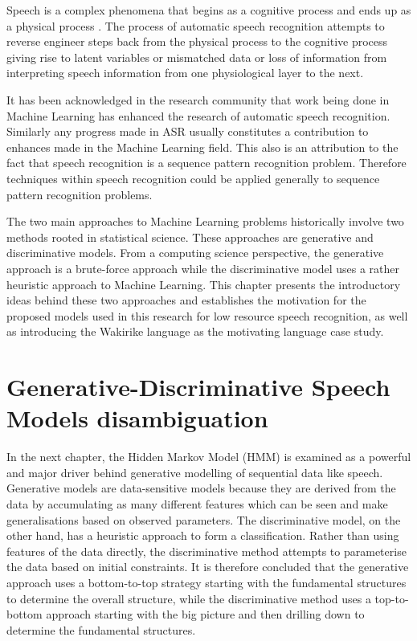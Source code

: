 Speech is a complex phenomena that begins as a cognitive process and ends up as a physical process \citep{becchetti1998}.  The process of automatic speech recognition attempts to reverse engineer steps back from the physical process to the cognitive process giving rise to latent variables or mismatched data or loss of information from interpreting speech information from one physiological layer to the next.

It has been acknowledged in the research community \citep{2015watanabe,deng2013machine}  that work being done in Machine Learning has enhanced the research of automatic speech recognition.  Similarly any progress made in ASR usually constitutes a contribution to enhances made in the Machine Learning field.  This also is an attribution to the fact that speech recognition is a sequence pattern recognition problem.  Therefore techniques within speech recognition could be applied generally to sequence pattern recognition problems.

The two main approaches to Machine Learning problems historically involve two methods rooted in statistical science.  These approaches are generative and discriminative models.  From a computing science perspective, the generative approach is a brute-force approach while the discriminative model uses a rather heuristic approach to Machine Learning. This chapter presents the introductory ideas behind these two approaches and establishes the motivation for the proposed models used in this research for low resource speech recognition, as well as introducing the Wakirike language as the motivating language case study.

\section{Generative-Discriminative Speech Models disambiguation}
\pagestyle{fancy}
In the next chapter, the Hidden Markov Model (HMM) is examined as a powerful and major driver behind generative modelling of sequential data like speech.  Generative models are data-sensitive models because they are derived from the data by accumulating as many different features which can be seen and make generalisations based on observed parameters. The discriminative model, on the other hand, has a heuristic approach to form a classification.  Rather than using features of the data directly, the discriminative method attempts to parameterise the data based on initial constraints. It is therefore concluded that the generative approach uses a bottom-to-top strategy starting with the fundamental structures to determine the overall structure, while the discriminative method uses a top-to-bottom approach starting with the big picture and then drilling down to determine the fundamental structures.

